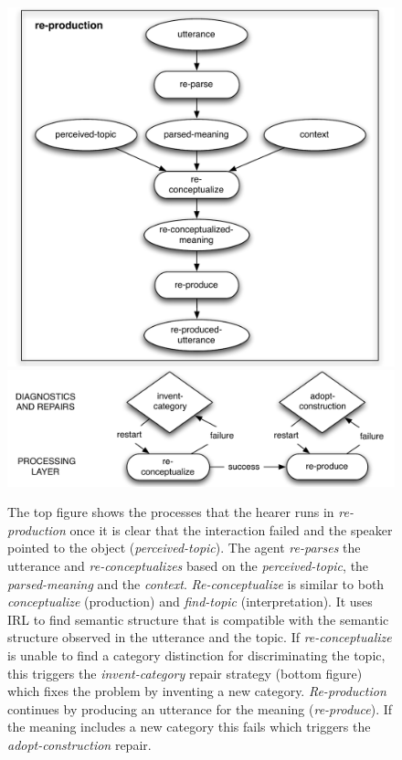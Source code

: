 \begin{figure}
\begin{center}
\includegraphics[width=0.75\columnwidth]{figs/task-re-production}
\includegraphics[width=0.75\columnwidth]{figs/diagnostics+repairs-adoption}
\end{center}
\caption[Re-production]{The top figure shows the processes that the hearer runs 
in \emph{re-production} once it is clear that the interaction failed and 
the speaker pointed to the object (\emph{perceived-topic}). 
The agent \emph{re-parses} the utterance and \emph{re-conceptualizes} based on 
the \emph{perceived-topic}, the \emph{parsed-meaning} and the \emph{context}. 
\emph{Re-conceptualize} is similar to both \emph{conceptualize} (production) 
and \emph{find-topic} (interpretation). It uses IRL to find 
semantic structure that is compatible with the semantic structure
observed in the utterance and the topic. If 
\emph{re-conceptualize} is unable to find a category distinction 
for discriminating the topic, this
triggers the \emph{invent-category} repair strategy (bottom figure) 
which fixes the problem by 
inventing a new category. \emph{Re-production} continues by 
producing an utterance for the meaning (\emph{re-produce}). 
If the meaning includes a new category this fails 
which triggers the \emph{adopt-construction} repair.}
\label{f:re-production+diagnostics+repairs}
\end{figure}

